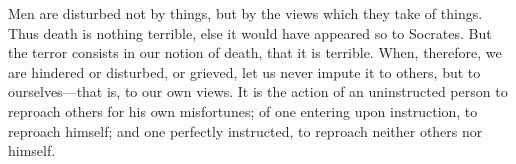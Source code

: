 Men are disturbed  not by things, but  by the views which they  take of things.
Thus death is nothing terrible, else it would have appeared so to Socrates. But
the  terror  consists in  our  notion  of death,  that  it  is terrible.  When,
therefore, we are hindered or disturbed, or  grieved, let us never impute it to
others, but to  ourselves---that is, to our  own views. It is the  action of an
uninstructed person to reproach others for his own misfortunes; of one entering
upon  instruction,  to  reproach  himself; and  one  perfectly  instructed,  to
reproach neither others nor himself.
